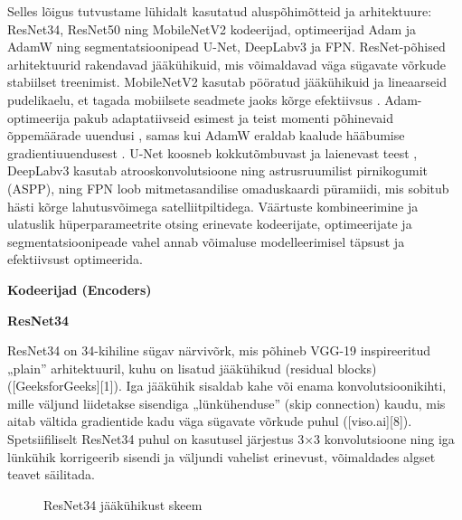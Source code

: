 Selles lõigus tutvustame lühidalt kasutatud aluspõhimõtteid ja arhitektuure:
ResNet34, ResNet50 ning MobileNetV2 kodeerijad, optimeerijad Adam ja AdamW ning
segmentatsioonipead U-Net, DeepLabv3 ja FPN\@. ResNet-põhised arhitektuurid
rakendavad jääkühikuid, mis võimaldavad väga sügavate võrkude stabiilset
treenimist. MobileNetV2 kasutab pööratud jääkühikuid ja lineaarseid pudelikaelu,
et tagada mobiilsete seadmete jaoks kõrge efektiivsus . Adam-optimeerija pakub
adaptatiivseid esimest ja teist momenti põhinevaid õppemäärade uuendusi , samas
kui AdamW eraldab kaalude hääbumise gradientiuuendusest . U-Net koosneb
kokkutõmbuvast ja laienevast teest , DeepLabv3 kasutab atrooskonvolutsioone ning
astrusruumilist pirnikogumit (ASPP), ning FPN loob mitmetasandilise omaduskaardi
püramiidi, mis sobitub hästi kõrge lahutusvõimega satelliitpiltidega. Väärtuste
kombineerimine ja ulatuslik hüperparameetrite otsing erinevate kodeerijate,
optimeerijate ja segmentatsioonipeade vahel annab võimaluse modelleerimisel
täpsust ja efektiivsust optimeerida.

\textbf{Kodeerijad (Encoders)}

\textbf{ResNet34}

ResNet34 on 34-kihiline sügav närvivõrk, mis põhineb VGG-19 inspireeritud „plain” arhitektuuril, kuhu on lisatud jääkühikud (residual blocks) ([GeeksforGeeks][1]). Iga jääkühik sisaldab kahe või enama konvolutsioonikihti, mille väljund liidetakse sisendiga „lünkühenduse” (skip connection) kaudu, mis aitab vältida gradientide kadu väga sügavate võrkude puhul ([viso.ai][8]). Spetsiifiliselt ResNet34 puhul on kasutusel järjestus 3×3 konvolutsioone ning iga lünkühik korrigeerib sisendi ja väljundi vahelist erinevust, võimaldades algset teavet säilitada.


\begin{figure}[H]
    \centering

    \caption{ResNet34 jääkühikust skeem}
    \label{fig:ResNet34jääkühikust}
\end{figure}

